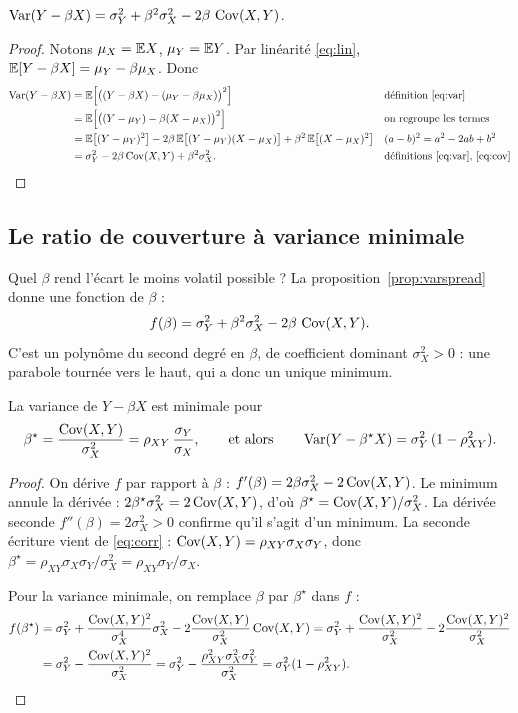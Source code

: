 \documentclass[11pt,a4paper]{article}
\begin{document}
\begin{proposition}\label{prop:varspread}
$\operatorname{Var}(Y - \beta X) = \sigma_Y^2 + \beta^2\sigma_X^2 - 2\beta\,\operatorname{Cov}(X,Y)$.
\end{proposition}
\begin{proof}
Notons $\mu_X = \mathbb{E} X$, $\mu_Y = \mathbb{E} Y$. Par linéarité \eqref{eq:lin}, $\mathbb{E}[Y-\beta X] = \mu_Y - \beta\mu_X$. Donc
\begin{align*}
\operatorname{Var}(Y-\beta X) &= \mathbb{E}\Big[\big((Y-\beta X) - (\mu_Y - \beta\mu_X)\big)^2\Big] && \text{définition \eqref{eq:var}}\\
&= \mathbb{E}\Big[\big((Y-\mu_Y) - \beta(X-\mu_X)\big)^2\Big] && \text{on regroupe les termes}\\
&= \mathbb{E}\big[(Y-\mu_Y)^2\big] - 2\beta\,\mathbb{E}\big[(Y-\mu_Y)(X-\mu_X)\big] + \beta^2\,\mathbb{E}\big[(X-\mu_X)^2\big] && (a-b)^2 = a^2 - 2ab + b^2\\
&= \sigma_Y^2 - 2\beta\operatorname{Cov}(X,Y) + \beta^2\sigma_X^2. && \text{définitions \eqref{eq:var}, \eqref{eq:cov}}
\end{align*}
\end{proof}

\subsection{Le ratio de couverture à variance minimale}

Quel $\beta$ rend l'écart le moins volatil possible ? La proposition~\ref{prop:varspread} donne une fonction de $\beta$ :
\[
f(\beta) = \sigma_Y^2 + \beta^2\sigma_X^2 - 2\beta\,\operatorname{Cov}(X,Y).
\]
C'est un polynôme du second degré en $\beta$, de coefficient dominant $\sigma_X^2 > 0$ : une parabole tournée vers le haut, qui a donc un unique minimum.

\begin{proposition}\label{prop:hedge}
La variance de $Y-\beta X$ est minimale pour
\[
\beta^\star = \frac{\operatorname{Cov}(X,Y)}{\sigma_X^2} = \rho_{XY}\,\frac{\sigma_Y}{\sigma_X},
\qquad\text{et alors}\qquad \operatorname{Var}(Y - \beta^\star X) = \sigma_Y^2\,(1-\rho_{XY}^2).
\]
\end{proposition}
\begin{proof}
On dérive $f$ par rapport à $\beta$ : $f'(\beta) = 2\beta\sigma_X^2 - 2\operatorname{Cov}(X,Y)$. Le minimum annule la dérivée : $2\beta^\star\sigma_X^2 = 2\operatorname{Cov}(X,Y)$, d'où $\beta^\star = \operatorname{Cov}(X,Y)/\sigma_X^2$. La dérivée seconde $f''(\beta) = 2\sigma_X^2 > 0$ confirme qu'il s'agit d'un minimum. La seconde écriture vient de \eqref{eq:corr} : $\operatorname{Cov}(X,Y) = \rho_{XY}\sigma_X\sigma_Y$, donc $\beta^\star = \rho_{XY}\sigma_X\sigma_Y/\sigma_X^2 = \rho_{XY}\sigma_Y/\sigma_X$.

Pour la variance minimale, on remplace $\beta$ par $\beta^\star$ dans $f$ :
\begin{align*}
f(\beta^\star) &= \sigma_Y^2 + \frac{\operatorname{Cov}(X,Y)^2}{\sigma_X^4}\sigma_X^2 - 2\frac{\operatorname{Cov}(X,Y)}{\sigma_X^2}\operatorname{Cov}(X,Y)
= \sigma_Y^2 + \frac{\operatorname{Cov}(X,Y)^2}{\sigma_X^2} - 2\frac{\operatorname{Cov}(X,Y)^2}{\sigma_X^2}\\
&= \sigma_Y^2 - \frac{\operatorname{Cov}(X,Y)^2}{\sigma_X^2} = \sigma_Y^2 - \frac{\rho_{XY}^2\sigma_X^2\sigma_Y^2}{\sigma_X^2} = \sigma_Y^2(1-\rho_{XY}^2).
\end{align*}
\end{proof}
\end{document}
